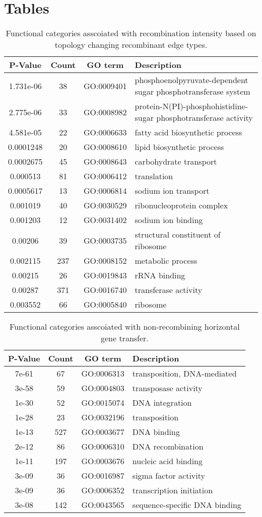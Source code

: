 \documentclass[english]{article}
\providecommand{\tabularnewline}{\\}
\begin{document}
\clearpage{}


\section*{Tables}

\clearpage{}

\begin{table}
\caption{\label{tab:functional}Functional categories asscoiated with 
recombination intensity based on topology changing recombinant edge types.}
\begin{tabular}{cccl}
\hline 
P-Value & Count & GO term & Description\tabularnewline
\hline 
1.731e-06 & 38 & GO:0009401 & phosphoenolpyruvate-dependent sugar phosphotransferase system\tabularnewline
2.775e-06 & 33 & GO:0008982 & protein-N(PI)-phosphohistidine-sugar phosphotransferase activity\tabularnewline
4.581e-05 & 22 & GO:0006633 & fatty acid biosynthetic process\tabularnewline
0.0001248 & 20 & GO:0008610 & lipid biosynthetic process\tabularnewline
0.0002675 & 45 & GO:0008643 & carbohydrate transport\tabularnewline
0.000513 & 81 & GO:0006412 & translation\tabularnewline
0.0005617 & 13 & GO:0006814 & sodium ion transport\tabularnewline
0.001019 & 40 & GO:0030529 & ribonucleoprotein complex\tabularnewline
0.001203 & 12 & GO:0031402 & sodium ion binding\tabularnewline
0.00206 & 39 & GO:0003735 & structural constituent of ribosome\tabularnewline
0.002115 & 237 & GO:0008152 & metabolic process\tabularnewline
0.00215 & 26 & GO:0019843 & rRNA binding\tabularnewline
0.00287 & 371 & GO:0016740 & transferase activity\tabularnewline
0.003552 & 66 & GO:0005840 & ribosome\tabularnewline
\hline 
\end{tabular}
\end{table}
\clearpage{}


%
\begin{table}
\caption{\label{tab:go-events}Functional categories asscoiated with 
non-recombining horizontal gene transfer.}
\begin{tabular}{cccl}
\hline 
P-Value & Count & GO term & Description \\
\hline 
7e-61 &  67 & GO:0006313 & transposition, DNA-mediated\\
3e-58 &  59 & GO:0004803 & transposase activity\\
1e-30 &  52 & GO:0015074 & DNA integration\\
1e-28 &  23 & GO:0032196 & transposition\\
1e-13 & 527 & GO:0003677 & DNA binding\\
2e-12 &  86 & GO:0006310 & DNA recombination\\
1e-11 & 197 & GO:0003676 & nucleic acid binding\\
3e-09 &  36 & GO:0016987 & sigma factor activity\\
3e-09 &  36 & GO:0006352 & transcription initiation\\
3e-08 & 142 & GO:0043565 & sequence-specific DNA binding\\
\hline 
\end{tabular}
\end{table}
\clearpage{}
\end{document}
